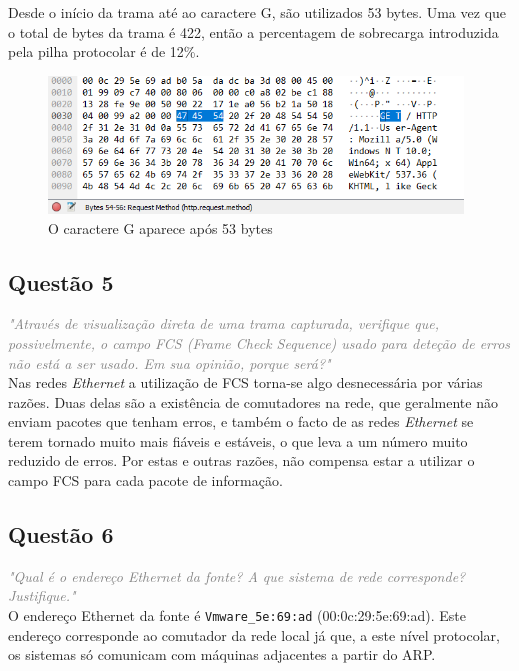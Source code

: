 \documentclass{llncs}
\newcommand{\questionE}[1]{\textcolor{gray}{\textit{"#1"}}}
\begin{document}
Desde o início da trama até ao caractere G, são utilizados 53 bytes. Uma vez que o total de bytes da trama é 422, então a percentagem de sobrecarga introduzida pela pilha protocolar é de 12\%.

\begin{figure}[H]
\begin{center}
\includegraphics[width=11cm]{4.PNG}
\end{center}
\caption{O caractere G aparece após 53 bytes}
\end{figure}

\subsection{Questão 5}
\hspace{3mm}
\questionE{Através de visualização direta de uma trama capturada, verifique que, possivelmente, o campo FCS (Frame Check Sequence) usado para deteção de erros não está a ser usado. Em sua opinião, porque será?}\\

Nas redes \textit{Ethernet} a utilização de FCS torna-se algo desnecessária por várias razões. Duas delas são a existência de comutadores na rede, que geralmente não enviam pacotes que tenham erros, e também o facto de as redes \textit{Ethernet} se terem tornado muito mais fiáveis e estáveis, o que leva a um número muito reduzido de erros. Por estas e outras razões, não compensa estar a utilizar o campo FCS para cada pacote de informação.

\subsection{Questão 6}
\hspace{3mm}
\questionE{Qual é o endereço Ethernet da fonte? A que sistema de rede corresponde? Justifique.}\\

O endereço Ethernet da fonte é \verb|Vmware_5e:69:ad| (00:0c:29:5e:69:ad). Este endereço corresponde ao comutador da rede local já que, a este nível protocolar, os sistemas só comunicam com máquinas adjacentes a partir do ARP.
\end{document}
